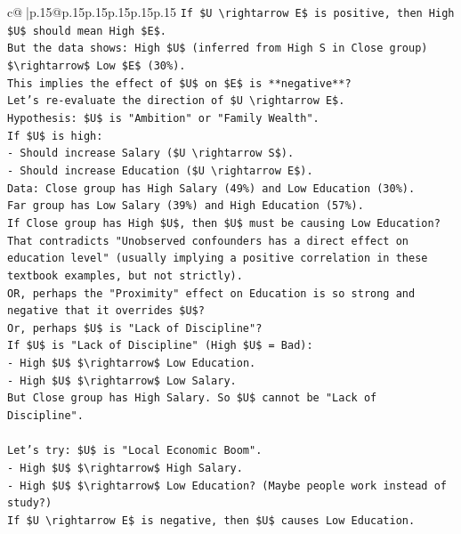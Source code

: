 \documentclass{article}
\begin{document}
{\begin{supertabular}{c@{$\;$}|p{.15\linewidth}@{}p{.15\linewidth}p{.15\linewidth}p{.15\linewidth}p{.15\linewidth}p{.15\linewidth}}
{{{\texttt{If \$U \textbackslash{}rightarrow E\$ is positive, then High \$U\$ should mean High \$E\$.} \\
\texttt{But the data shows: High \$U\$ (inferred from High S in Close group) \$\textbackslash{}rightarrow\$ Low \$E\$ (30\%).} \\
\texttt{This implies the effect of \$U\$ on \$E\$ is **negative**?} \\
\texttt{Let's re{-}evaluate the direction of \$U \textbackslash{}rightarrow E\$.} \\
\texttt{Hypothesis: \$U\$ is "Ambition" or "Family Wealth".} \\
\texttt{If \$U\$ is high:} \\
\texttt{{-} Should increase Salary (\$U \textbackslash{}rightarrow S\$).} \\
\texttt{{-} Should increase Education (\$U \textbackslash{}rightarrow E\$).} \\
\texttt{Data: Close group has High Salary (49\%) and Low Education (30\%).} \\
\texttt{Far group has Low Salary (39\%) and High Education (57\%).} \\
\texttt{If Close group has High \$U\$, then \$U\$ must be causing Low Education? That contradicts "Unobserved confounders has a direct effect on education level" (usually implying a positive correlation in these textbook examples, but not strictly).} \\
\texttt{OR, perhaps the "Proximity" effect on Education is so strong and negative that it overrides \$U\$?} \\
\texttt{Or, perhaps \$U\$ is "Lack of Discipline"?} \\
\texttt{If \$U\$ is "Lack of Discipline" (High \$U\$ = Bad):} \\
\texttt{{-} High \$U\$ \$\textbackslash{}rightarrow\$ Low Education.} \\
\texttt{{-} High \$U\$ \$\textbackslash{}rightarrow\$ Low Salary.} \\
\texttt{But Close group has High Salary. So \$U\$ cannot be "Lack of Discipline".} \\
\\ 
\texttt{Let's try: \$U\$ is "Local Economic Boom".} \\
\texttt{{-} High \$U\$ \$\textbackslash{}rightarrow\$ High Salary.} \\
\texttt{{-} High \$U\$ \$\textbackslash{}rightarrow\$ Low Education? (Maybe people work instead of study?)} \\
\texttt{If \$U \textbackslash{}rightarrow E\$ is negative, then \$U\$ causes Low Education.} \\
}}}
\end{supertabular}}
\end{document}
